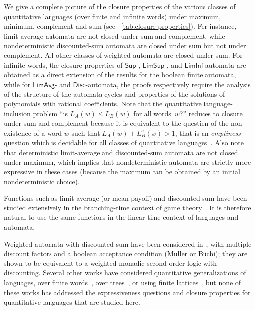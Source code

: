 \documentclass{llncs}
\newcommand{\Max}{\mathsf{Sup}}
\newcommand{\LimSup}{\mathsf{LimSup}}
\newcommand{\LimInf}{\mathsf{LimInf}}
\newcommand{\LimAvg}{\mathsf{LimAvg}}
\newcommand{\Disc}{\mathsf{Disc}}
\begin{document}
We give a complete picture of the closure properties of 
the various classes of quantitative languages (over finite and infinite words) under maximum,
minimum, complement and sum (see \tablename~\ref{tab:closure-properties}).
For instance, limit-average automata are not closed under sum and complement,
while nondeterministic discounted-sum automata are closed under sum but not under complement.
All other classes of weighted automata are closed under sum.
For infinite words, the closure properties of $\Max$-, $\LimSup$-, and $\LimInf$-automata
are obtained as a direct extension of the results for the boolean finite automata,
while for $\LimAvg$- and $\Disc$-automata, the proofs respectively require the analysis of the structure
of the automata cycles and properties of the solutions of polynomials with rational coefficients.
Note that the quantitative language-inclusion problem 
``is $L_{A}(w)\leq L_{B}(w)$  for all words~$w$?'' reduces to 
closure under sum and complement because it is equivalent 
to the question of the non-existence of a word $w$ such that $L_{A}(w) + L^c_{B}(w) > 1$,
that is an \emph{emptiness} question which is decidable for all classes
of quantitative languages~\cite{CDH08}.
Also note that deterministic limit-average and discounted-sum automata are not 
closed under maximum, which implies that nondeterministic automata are strictly more expressive in these cases 
(because the maximum can be obtained by an initial nondeterministic choice). 








\smallskip{} Functions such as limit average (or mean payoff) and discounted 
sum have been studied extensively in the branching-time context of game theory~\cite{Sha53,EM79,Condon92,ZwickP96,CAHS03}.
It is therefore natural to use the same functions in the linear-time context of languages
and automata. 

Weighted automata with discounted sum have been considered in~\cite{DrosteR07},
with multiple discount factors and a boolean acceptance condition (Muller or B\"uchi); 
they are shown to be equivalent to a weighted monadic second-order logic with
discounting. Several other works have considered quantitative generalizations of 
languages, over finite words~\cite{DrosteGastin07}, over trees~\cite{DrosteKR08},
or using finite lattices~\cite{GurfinkelC03}, but none of these works
has addressed the expressiveness questions and closure properties for quantitative 
languages that are studied here.
\end{document}
